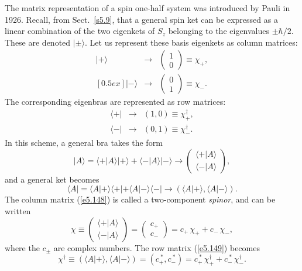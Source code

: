 The matrix representation of a  spin one-half system was introduced by Pauli in 1926. 
Recall, from Sect.~\ref{s5.9}, that a general spin ket can be expressed as
a linear combination of the two eigenkets of $S_z$ belonging to the
eigenvalues $\pm \hbar/2$. These are denoted  $|\pm\rangle$. Let us
represent these basis eigenkets as column matrices:
\begin{eqnarray}
|+\rangle&\rightarrow &\left(\!\begin{array}{c}1\\0\end{array}\!\right) \equiv \chi_+,\\
[0.5ex]
|-\rangle &\rightarrow& \left(\!\begin{array}{c}0\\1\end{array}\!\right) \equiv \chi_-.
\end{eqnarray}
The corresponding eigenbras are represented as row matrices:
\begin{eqnarray}
\langle +| &\rightarrow& (1, 0) \equiv \chi_+^{\dag}, \\[0.5ex]
\langle - |&\rightarrow& (0, 1) \equiv \chi_-^{\dag}.
\end{eqnarray}
In this scheme, a general  bra takes the form 
\begin{equation}\label{e5.148}
|A\rangle = \langle +|A\rangle |+\rangle + \langle -|A\rangle |-\rangle
\rightarrow
\left(\!\begin{array}{c}\langle +|A\rangle\\
\langle -|A\rangle\end{array}\!\right),
\end{equation}
and a general ket becomes
\begin{equation}\label{e5.149}
\langle A| =\langle A|+\rangle \langle +| + \langle A|-\rangle \langle -|
\rightarrow (\langle A|+\rangle, \langle A|-\rangle).
\end{equation}
The column matrix (\ref{e5.148})  is called a two-component {\em spinor}, and can be written
\begin{equation}
\chi \equiv \left(\!\begin{array}{c}\langle +|A\rangle\\
\langle -|A\rangle\end{array}\!\right) =\left(\!\begin{array}{c}
c_+\\ c_- \end{array}\!\right) = c_+\, \chi_+ + c_- \,\chi_-,
\end{equation}
where the $c_\pm$ are complex numbers. The row matrix (\ref{e5.149}) becomes
\begin{equation}
\chi^{\dag} \equiv (\langle A|+\rangle, \langle A|-\rangle) =(c_+^{~\ast}, c_-^{~\ast}) =c_+^{~\ast}\, \chi_+^{\dag} + c_-^{~\ast}\,\chi_-^{\dag}.
\end{equation}

